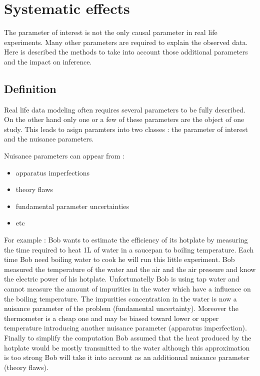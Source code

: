 \section{Systematic effects} %
\label{sec:systematic_effects}


The parameter of interest is not the only causal parameter in real life experiments.
Many other parameters are required to explain the observed data.
Here is described the methods to take into account those additional parameters and the impact on inference. 



\subsection{Definition} %
\label{sub:definition}

Real life data modeling often requires several parameters to be fully described.
On the other hand only one or a few of these parameters are the object of one study.
This leads to asign paramters into two classes : the parameter of interest and the nuisance parameters.

Nuisance parameters can appear from :
\begin{itemize}
	\item apparatus imperfections
	\item theory flaws
	\item fundamental parameter uncertainties
	\item etc
\end{itemize}

For example : Bob wants to estimate the efficiency of its hotplate by measuring the time required to heat 1L of water in a saucepan to boiling temperature.
Each time Bob need boiling water to cook he will run this little experiment.
Bob measured the temperature of the water and the air and the air pressure and know the electric power of his hotplate.
Unfortunatelly Bob is using tap water and cannot measure the amount of impurities in the water which have a influence on the boiling temperature.
The impurities concentration in the water is now a nuisance parameter of the problem (fundamental uncertainty).
Moreover the thermometer is a cheap one and may be biased toward lower or upper temperature introducing another nuisance parameter (apparatus imperfection).
Finally to simplify the computation Bob assumed that the heat produced by the hotplate would be mostly transmitted to the water although this approximation is too strong Bob will take it into account as an additionnal nuisance parameter (theory flaws).





